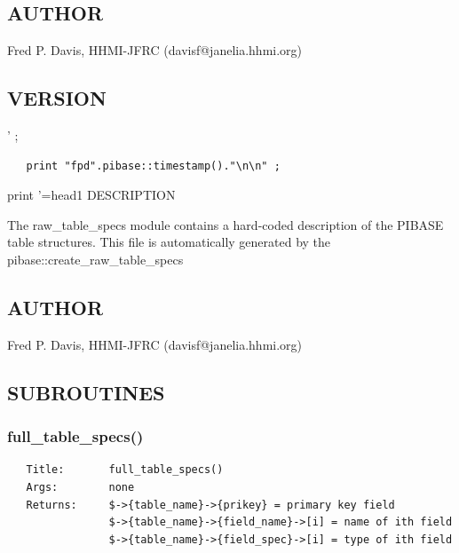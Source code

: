 \documentclass{article}
\begin{document}
\subsection*{AUTHOR\label{pibase::create_raw_table_specs_AUTHOR}}


Fred P. Davis, HHMI-JFRC (davisf@janelia.hhmi.org)

\subsection*{VERSION\label{pibase::create_raw_table_specs_VERSION}}


' ;

\begin{verbatim}
   print "fpd".pibase::timestamp()."\n\n" ;
\end{verbatim}


print '=head1 DESCRIPTION



The raw\_table\_specs module contains a hard-coded description of the PIBASE
table structures. This file is automatically generated by the
pibase::create\_raw\_table\_specs

\subsection*{AUTHOR\label{pibase::create_raw_table_specs_AUTHOR}}


Fred P. Davis, HHMI-JFRC (davisf@janelia.hhmi.org)

\subsection*{SUBROUTINES\label{pibase::create_raw_table_specs_SUBROUTINES}}
\subsubsection*{full\_table\_specs()\label{pibase::create_raw_table_specs_full_table_specs_}}
\begin{verbatim}
   Title:       full_table_specs()
   Args:        none
   Returns:     $->{table_name}->{prikey} = primary key field
                $->{table_name}->{field_name}->[i] = name of ith field
                $->{table_name}->{field_spec}->[i] = type of ith field
\end{verbatim}
\clearpage
\end{document}
